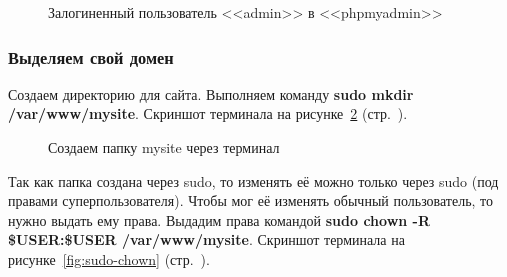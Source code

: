 \begin{figure}[p]
    \caption{Залогиненный пользователь <<admin>> в <<phpmyadmin>>}
    \label{fig:make-phpmyadmin-superuser-step-7}
\end{figure}

\newpage


\subsubsection*{Выделяем свой домен}

Создаем директорию для сайта. Выполняем команду \textbf{sudo mkdir /var/www/mysite}.
Скриншот терминала на рисунке~\ref{fig:sudo-mkdir-mysite} (стр.~\pageref{fig:sudo-mkdir-mysite}).

\begin{figure}[p]
    \caption{Создаем папку mysite через терминал}
    \label{fig:sudo-mkdir-mysite}
\end{figure}

Так как папка создана через sudo, то изменять её можно только через sudo (под правами суперпользователя). Чтобы мог её изменять обычный пользователь, то нужно выдать ему права. Выдадим права командой \textbf{sudo chown -R \$USER:\$USER /var/www/mysite}.
Скриншот терминала на рисунке~\ref{fig:sudo-chown} (стр.~\pageref{fig:sudo-chown}).

